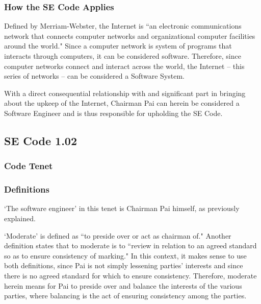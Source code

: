 \documentclass[12pt]{article}
\begin{document}
\begin{multicols}{2}
\subsubsection{How the SE Code Applies}
Defined by Merriam-Webster, the Internet is ``an electronic communications network that connects computer networks and organizational computer facilities around the world."\cite{webster} Since a computer network is system of programs that interacts through computers, it can be considered software. Therefore, since computer networks connect and interact across the world, the Internet -- this series of networks -- can be considered a Software System.

With a direct consequential relationship with and significant part in bringing about the upkeep of the Internet, Chairman Pai can herein be considered a Software Engineer and is thus responsible for upholding the SE Code.\cite{SE-code}



\subsection{SE Code 1.02}
\subsubsection{Code Tenet}

\subsubsection{Definitions}
`The software engineer' in this tenet is Chairman Pai himself, as previously explained.

`Moderate' is defined as ``to preside over or act as chairman of."\cite{webster} Another definition states that to moderate is to ``review in relation to an agreed standard so as to ensure consistency of marking."\cite{oxford} In this context, it makes sense to use both definitions, since Pai is not simply lessening parties' interests and since there is no agreed standard for which to ensure consistency. Therefore, moderate herein means for Pai to preside over and balance the interests of the various parties, where balancing is the act of ensuring consistency among the parties.


\end{multicols}
\end{document}

